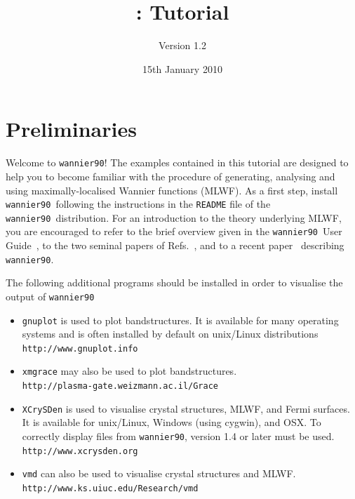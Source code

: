 \documentclass[a4paper,11pt,twoside]{article}
\title{\wannier: Tutorial}
\author{Version 1.2}
\date{15th January 2010}
\begin{document}
\newcommand{\wannier}{{\rm\texttt{wannier90}}}
\newcommand{\postw}{{\rm\texttt{postw90}}}
\newcommand{\bw}{{\rm\texttt{BoltzWann}}}
\newcommand{\pwscf}{\textsc{pwscf}}
\newcommand{\QE}{\textsc{quantum-espresso}}
\newcommand{\Mkb}{\mathbf{M}^{(\mathbf{k},\mathbf{b})}}
\newcommand{\Ak}{\mathbf{A}^{(\mathbf{k})}}
\newcommand{\Uk}{\mathbf{U}^{(\mathbf{k})}}

\maketitle

\section*{Preliminaries}

Welcome to \wannier! The examples contained in this tutorial are
designed to help you to become familiar with the procedure of
generating, analysing and using maximally-localised Wannier functions
(MLWF). As a first step, install \wannier\ following the
instructions in the {\tt README} file of the \wannier\ distribution.
For an introduction to the theory underlying MLWF, you are encouraged
to refer to the brief overview given in the \wannier\ User
Guide~\cite{UserGuide}, to the two seminal papers of
Refs.~\cite{MV,SMV}, and to a recent paper~\cite{W90} describing
\wannier.

The following additional programs should be installed in order to
visualise the output of \wannier\ 
\begin{itemize}
\item {\tt gnuplot} is used to plot bandstructures. It is 
available for many operating systems and is often installed by default on
 unix/Linux distributions\\
{\tt http://www.gnuplot.info}
\item {\tt xmgrace} may also be used to plot bandstructures.\\
{\tt http://plasma-gate.weizmann.ac.il/Grace}
\item {\tt XCrySDen} is used to visualise crystal structures, MLWF,
  and Fermi surfaces. It is available for unix/Linux, 
  Windows (using cygwin), and OSX. To correctly display 
files from \wannier, version 1.4 or later must be used.\\
{\tt http://www.xcrysden.org}
\item {\tt vmd} can also be used to visualise crystal structures and
  MLWF.\\
{\tt http://www.ks.uiuc.edu/Research/vmd}
\end{itemize}
\end{document}
